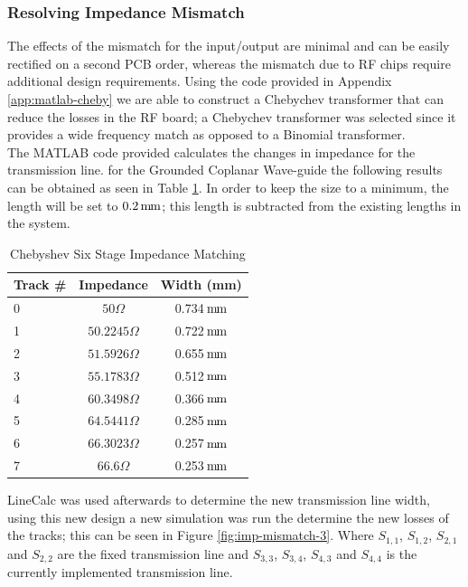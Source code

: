 \documentclass[12pt,openany,a4paper]{book}
\newcommand{\pack}	{\hspace{-0.08em}}
\newcommand{\mm}	{\ensuremath{\rm\,m\pack m}}
\begin{document}
\subsubsection{Resolving Impedance Mismatch}
The effects of the mismatch for the input/output are minimal and can be easily rectified on a second PCB order, whereas the mismatch due to RF chips require additional design requirements. Using the code provided in Appendix \ref{app:matlab-cheby} we are able to construct a Chebychev transformer that can reduce the losses in the RF board; a Chebychev transformer was selected since it provides a wide frequency match as opposed to a Binomial transformer. \\[0.2cm]
The MATLAB code provided calculates the changes in impedance for the transmission line. for the Grounded Coplanar Wave-guide the following results can be obtained as seen in Table \ref{tab:cheby-6imp}. In order to keep the size to a minimum, the length will be set to $0.2\mm$; this length is subtracted from the existing lengths in the system.
\begin{table}[H]
\centering
\begin{tabular}{l c c}
	\hline
	Track \# & Impedance & Width (mm) \\
	\hline
	0 & $50\Omega$ 		& 0.734\mm \\
	1 & $50.2245\Omega$ & 0.722\mm \\
	2 & $51.5926\Omega$ & 0.655\mm \\
	3 & $55.1783\Omega$ & 0.512\mm \\
	4 & $60.3498\Omega$ & 0.366\mm \\
	5 & $64.5441\Omega$ & 0.285\mm \\
	6 & $66.3023\Omega$ & 0.257\mm \\
	7 & $66.6\Omega$ 	& 0.253\mm \\	
	\hline
\end{tabular} 
\caption{Chebyshev Six Stage Impedance Matching}
\label{tab:cheby-6imp}
\end{table}
LineCalc was used afterwards to determine the new transmission line width, using this new design a new simulation was run the determine the new losses of the tracks; this can be seen in Figure \ref{fig:imp-mismatch-3}. Where $S_{1,1}$, $S_{1,2}$, $S_{2,1}$ and $S_{2,2}$ are the fixed transmission line and $S_{3,3}$, $S_{3,4}$, $S_{4,3}$ and $S_{4,4}$ is the currently implemented transmission line.
\end{document}
